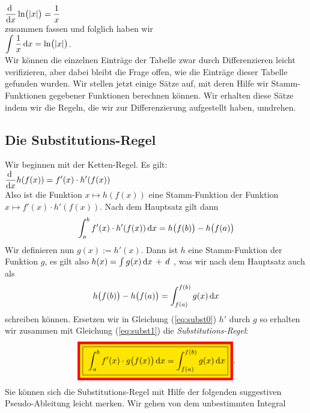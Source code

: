 \hspace*{1.3cm}
$\displaystyle\frac{\textrm{d}\;}{\textrm{d}x} \ln\bigl(|x|\bigr) = \frac{1}{x}$
\\[0.2cm]
zusammen fassen und folglich haben wir
\\[0.2cm]
\hspace*{1.3cm}
 $\displaystyle\int \frac{1}{x}\,\textrm{d} x = \ln\bigl(|x|\bigr)$.
\\[0.2cm]
Wir k\"onnen die einzelnen Eintr\"age der Tabelle zwar durch Differenzieren leicht
verifizieren, aber dabei bleibt die Frage offen, wie die Eintr\"age dieser Tabelle gefunden
wurden.  Wir stellen jetzt einige S\"atze auf, mit deren Hilfe wir Stamm-Funktionen
gegebener Funktionen berechnen k\"onnen.  Wir erhalten diese S\"atze indem wir die
Regeln, die wir zur Differenzierung aufgestellt haben, umdrehen.  


\subsection{Die Substitutions-Regel}
Wir beginnen mit der Ketten-Regel. Es gilt:
\\[0.3cm]
\hspace*{1.3cm}
$\displaystyle\frac{\textrm{d}\;}{\textrm{d}x} h(f(x)) = f'(x) \cdot  h'(f(x))$
\\[0.3cm]
Also ist die Funktion $x \mapsto h(f(x))$ eine Stamm-Funktion der Funktion $x \mapsto f'(x) \cdot  h'(f(x))$.
Nach dem Hauptsatz gilt dann 
\begin{equation}
  \label{eq:subst0}
  \int_a^b f'(x) \cdot  h'(f(x))\, \textrm{d} x  =  h\bigl(f(b)\bigr) - h\bigl(f(a)\bigr)
\end{equation} 
Wir definieren nun $g(x) := h'(x)$.  Dann ist $h$ eine Stamm-Funktion der Funktion $g$, es
gilt also $h(x) = \int g(x)\, \textrm{d} x \,+\, d$ , was wir nach dem Hauptsatz auch als
\begin{equation}
  \label{eq:subst1}
h\bigl(f(b)\bigr) - h\bigl(f(a)\bigr) = \int_{f(a)}^{f(b)} g(x)\,\textrm{d} x  
\end{equation}
schreiben k\"onnen.
Ersetzen wir in Gleichung (\ref{eq:subst0})  $h'$
durch $g$ so erhalten wir zusammen mit Gleichung (\ref{eq:subst1})  die \emph{Substitutions-Regel}:
\begin{equation}
  \label{eq:subst}
\colorbox{red}{\colorbox{orange}{\framebox{
$\ds\int_a^b f'(x) \cdot  g\bigl(f(x)\bigr)\, \dr x = \int_{f(a)}^{f(b)} g(x)\, \dr x$}}}.  
\end{equation}
Sie k\"onnen sich die Substitutions-Regel mit Hilfe der folgenden suggestiven Pseudo-Ableitung
leicht merken.  Wir gehen von dem unbestimmten Integral 
